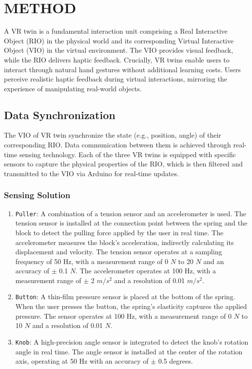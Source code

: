 \section{METHOD}
A VR twin is a fundamental interaction unit comprising a Real Interactive Object (RIO) in the physical world and its corresponding Virtual Interactive Object (VIO) in the virtual environment. The VIO provides visual feedback, while the RIO delivers haptic feedback. Crucially, VR twins enable users to interact through natural hand gestures without additional learning costs. Users perceive realistic haptic feedback during virtual interactions, mirroring the experience of manipulating real-world objects.

\subsection{Data Synchronization}
The VIO of VR twin synchronize the state (e.g., position, angle) of their corresponding RIO. Data communication between them is achieved through real-time sensing technology. Each of the three VR twins is equipped with specific sensors to capture the physical properties of the RIO, which is then filtered and transmitted to the VIO via Arduino for real-time updates.

\subsubsection{Sensing Solution}
\begin{enumerate}
  \item {\texttt{Puller}}: A combination of a tension sensor and an accelerometer is used. The tension sensor is installed at the connection point between the spring and the block to detect the pulling force applied by the user in real time. The accelerometer measures the block's acceleration, indirectly calculating its displacement and velocity. The tension sensor operates at a sampling frequency of 50 Hz, with a measurement range of 0 $N$ to 20 $N$ and an accuracy of $\pm$ 0.1 $N$. The accelerometer operates at 100 Hz, with a measurement range of $\pm$ 2 $m/s^2$ and a resolution of 0.01 $m/s^2$.

  \item {\texttt{Button}}: A thin-film pressure sensor is placed at the bottom of the spring. When the user presses the button, the spring's elasticity captures the applied pressure. The sensor operates at 100 Hz, with a measurement range of 0 $N$ to 10 $N$ and a resolution of 0.01 $N$.

  \item {\texttt{Knob}}: A high-precision angle sensor is integrated to detect the knob's rotation angle in real time. The angle sensor is installed at the center of the rotation axis, operating at 50 Hz with an accuracy of $\pm$ 0.5 degrees.
\end{enumerate}

